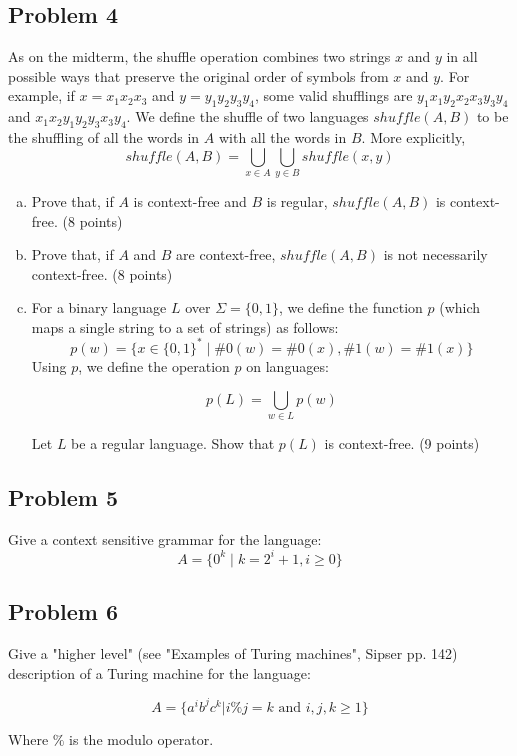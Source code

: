 \documentclass{article}
\begin{document}
\subsection*{Problem 4}
As on the midterm, the shuffle operation combines two strings $x$ and $y$ in all possible
ways that preserve the original order of symbols from $x$ and $y$.  For example, if
$x=x_1x_2x_3$ and $y=y_1y_2y_3y_4$, some valid shufflings are $y_1x_1y_2x_2x_3y_3y_4$ and
$x_1x_2y_1y_2y_3x_3y_4$.  We define the shuffle of two languages $shuffle(A,B)$ to be the
shuffling of all the words in $A$ with all the words in $B$.  More explicitly,
    \[shuffle(A,B)=\bigcup\limits_{x \in A}\bigcup\limits_{y \in B} shuffle(x,y)\]
    \begin{enumerate}[(a)]
    \item Prove that, if $A$ is context-free and $B$ is regular, $shuffle(A,B)$ is
    context-free. (8 points)
    \item Prove that, if $A$ and $B$ are context-free, $shuffle(A,B)$ is not necessarily
    context-free. (8 points)
    \item For a binary language $L$ over $\Sigma=\{0,1\}$, we define the function $p$ (which
    maps a single string to a set of strings) as follows:
    \[p(w) = \{ x \in \{0,1\}^* \;|\; \#0(w) = \#0(x), \#1(w) = \#1(x) \}\]
    Using $p$, we define the operation $p$ on languages:

    \[p(L) = \bigcup\limits_{w \in L} p(w)\]

    Let $L$ be a regular language.  Show that $p(L)$ is context-free. (9 points)
\end{enumerate}
\newpage
\subsection*{Problem 5}

    Give a context sensitive grammar for the language:
    \[A = \{0^k \;|\; k = 2^i+1,i\ge0\}\]

\newpage
\subsection*{Problem 6}
Give a "higher level" (see "Examples of Turing machines", Sipser pp. 142) description of a
Turing machine for the language:

    \[A=\{a^ib^jc^k | i\%j=k \text{ and } i,j,k\ge1\}\]

    Where $\%$ is the modulo operator.
\end{document}
